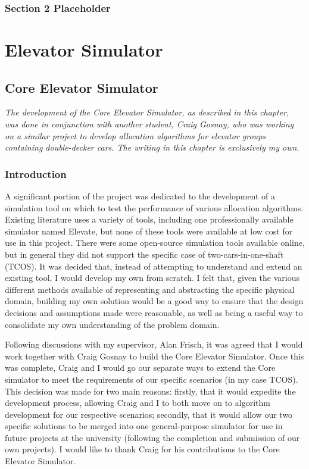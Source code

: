 \documentclass{UoYCSproject}
\begin{document}
\section{Section 2 Placeholder}

\part{Elevator Simulator}

\chapter{Core Elevator Simulator}
\label{ceschapter}

\textit{The development of the Core Elevator Simulator, as described in this chapter, was done in conjunction with another student, Craig Gosnay, who was working on a similar project to develop allocation algorithms for elevator groups containing double-decker cars.  The writing in this chapter is exclusively my own.}

\section{Introduction}

A significant portion of the project was dedicated to the development of a simulation tool on which to test the performance of various allocation algorithms.  Existing literature uses a variety of tools, including one professionally available simulator named Elevate, but none of these tools were available at low cost for use in this project.  There were some open-source simulation tools available online, but in general they did not support the specific case of two-cars-in-one-shaft (TCOS).  It was decided that, instead of attempting to understand and extend an existing tool, I would develop my own from scratch.  I felt that, given the various different methods available of representing and abstracting the specific physical domain, building my own solution would be a good way to ensure that the design decisions and assumptions made were reasonable, as well as being a useful way to consolidate my own understanding of the problem domain.

Following discussions with my supervisor, Alan Frisch, it was agreed that I would work together with Craig Gosnay to build the Core Elevator Simulator.  Once this was complete, Craig and I would go our separate ways to extend the Core simulator to meet the requirements of our specific scenarios (in my case TCOS).  This decision was made for two main reasons: firstly, that it would expedite the development process, allowing Craig and I to both move on to algorithm development for our respective scenarios; secondly, that it would allow our two specific solutions to be merged into one general-purpose simulator for use in future projects at the university (following the completion and submission of our own projects).  I would like to thank Craig for his contributions to the Core Elevator Simulator.
\end{document}
